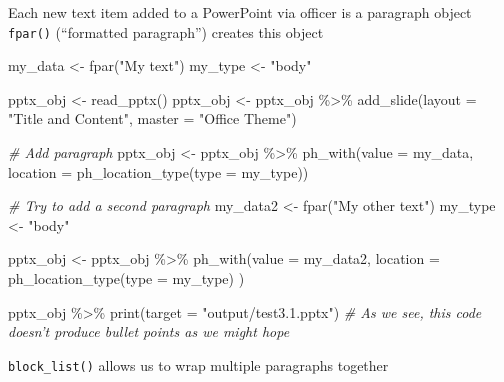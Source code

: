\documentclass[
]{book}
\newenvironment{Shaded}{\begin{snugshade}}{\end{snugshade}}
\newcommand{\AttributeTok}[1]{\textcolor[rgb]{0.77,0.63,0.00}{#1}}
\newcommand{\CommentTok}[1]{\textcolor[rgb]{0.56,0.35,0.01}{\textit{#1}}}
\newcommand{\FunctionTok}[1]{\textcolor[rgb]{0.00,0.00,0.00}{#1}}
\newcommand{\NormalTok}[1]{#1}
\newcommand{\OtherTok}[1]{\textcolor[rgb]{0.56,0.35,0.01}{#1}}
\newcommand{\SpecialCharTok}[1]{\textcolor[rgb]{0.00,0.00,0.00}{#1}}
\newcommand{\StringTok}[1]{\textcolor[rgb]{0.31,0.60,0.02}{#1}}
\begin{document}
Each new text item added to a PowerPoint via officer is a paragraph object
\texttt{fpar()} (``formatted paragraph'') creates this object

\begin{Shaded}
\begin{Highlighting}[]
\NormalTok{my\_data }\OtherTok{\textless{}{-}} \FunctionTok{fpar}\NormalTok{(}\StringTok{"My text"}\NormalTok{)}
\NormalTok{my\_type }\OtherTok{\textless{}{-}} \StringTok{"body"}

\NormalTok{pptx\_obj }\OtherTok{\textless{}{-}} \FunctionTok{read\_pptx}\NormalTok{() }
\NormalTok{pptx\_obj }\OtherTok{\textless{}{-}}\NormalTok{ pptx\_obj }\SpecialCharTok{\%\textgreater{}\%} 
  \FunctionTok{add\_slide}\NormalTok{(}\AttributeTok{layout =} \StringTok{"Title and Content"}\NormalTok{, }\AttributeTok{master =} \StringTok{"Office Theme"}\NormalTok{)}

\CommentTok{\# Add paragraph}
\NormalTok{pptx\_obj }\OtherTok{\textless{}{-}}\NormalTok{ pptx\_obj }\SpecialCharTok{\%\textgreater{}\%} 
  \FunctionTok{ph\_with}\NormalTok{(}\AttributeTok{value =}\NormalTok{ my\_data, }\AttributeTok{location =} \FunctionTok{ph\_location\_type}\NormalTok{(}\AttributeTok{type =}\NormalTok{ my\_type))}

\CommentTok{\# Try to add a second paragraph}
\NormalTok{my\_data2 }\OtherTok{\textless{}{-}} \FunctionTok{fpar}\NormalTok{(}\StringTok{"My other text"}\NormalTok{)}
\NormalTok{my\_type }\OtherTok{\textless{}{-}} \StringTok{"body"}

\NormalTok{pptx\_obj }\OtherTok{\textless{}{-}}\NormalTok{ pptx\_obj }\SpecialCharTok{\%\textgreater{}\%} 
  \FunctionTok{ph\_with}\NormalTok{(}\AttributeTok{value =}\NormalTok{ my\_data2, }\AttributeTok{location =} \FunctionTok{ph\_location\_type}\NormalTok{(}\AttributeTok{type =}\NormalTok{ my\_type) )}

\NormalTok{pptx\_obj }\SpecialCharTok{\%\textgreater{}\%}
  \FunctionTok{print}\NormalTok{(}\AttributeTok{target =} \StringTok{"output/test3.1.pptx"}\NormalTok{) }
\CommentTok{\# As we see, this code doesn’t produce bullet points as we might hope}
\end{Highlighting}
\end{Shaded}

\texttt{block\_list()} allows us to wrap multiple paragraphs together
\end{document}
